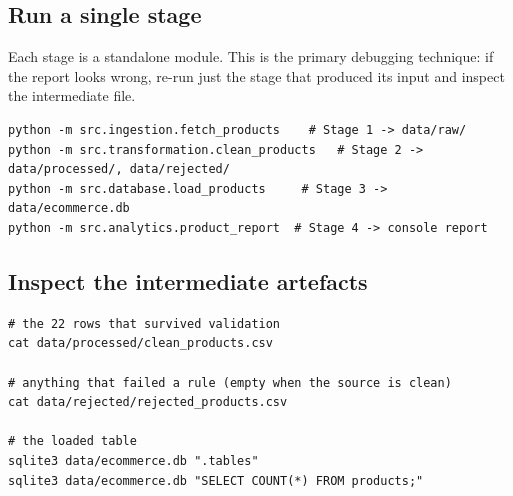 \subsection{Run a single stage}

Each stage is a standalone module. This is the primary debugging technique:
if the report looks wrong, re-run just the stage that produced its input
and inspect the intermediate file.

\begin{codebox}
\noindent
\begin{lstlisting}[style=sh]
python -m src.ingestion.fetch_products    # Stage 1 -> data/raw/
python -m src.transformation.clean_products   # Stage 2 -> data/processed/, data/rejected/
python -m src.database.load_products     # Stage 3 -> data/ecommerce.db
python -m src.analytics.product_report  # Stage 4 -> console report
\end{lstlisting}
\end{codebox}

\subsection{Inspect the intermediate artefacts}

\begin{codebox}
\noindent
\begin{lstlisting}[style=sh]
# the 22 rows that survived validation
cat data/processed/clean_products.csv

# anything that failed a rule (empty when the source is clean)
cat data/rejected/rejected_products.csv

# the loaded table
sqlite3 data/ecommerce.db ".tables"
sqlite3 data/ecommerce.db "SELECT COUNT(*) FROM products;"
\end{lstlisting}
\end{codebox}

